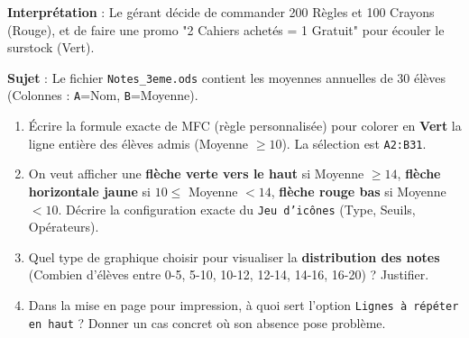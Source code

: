 \documentclass[11pt]{article}
\begin{document}
\begin{experience}
\textbf{Interprétation} : Le gérant décide de commander 200 Règles et 100 Crayons (Rouge), et de faire une promo "2 Cahiers achetés = 1 Gratuit" pour écouler le surstock (Vert).
\end{experience}

\begin{exercice}
\textbf{Sujet} : Le fichier \texttt{Notes\_3eme.ods} contient les moyennes annuelles de 30 élèves (Colonnes : \texttt{A}=Nom, \texttt{B}=Moyenne).
\begin{enumerate}
    \item Écrire la formule exacte de MFC (règle personnalisée) pour colorer en \textbf{Vert} la ligne entière des élèves admis (Moyenne $\ge 10$). La sélection est \texttt{A2:B31}.
    \item On veut afficher une \textbf{flèche verte vers le haut} si Moyenne $\ge 14$, \textbf{flèche horizontale jaune} si $10 \le$ Moyenne $< 14$, \textbf{flèche rouge bas} si Moyenne $< 10$. Décrire la configuration exacte du \texttt{Jeu d'icônes} (Type, Seuils, Opérateurs).
    \item Quel type de graphique choisir pour visualiser la \textbf{distribution des notes} (Combien d'élèves entre 0-5, 5-10, 10-12, 12-14, 14-16, 16-20) ? Justifier.
    \item Dans la mise en page pour impression, à quoi sert l'option \texttt{Lignes à répéter en haut} ? Donner un cas concret où son absence pose problème.
\end{enumerate}
\end{exercice}
\end{document}
